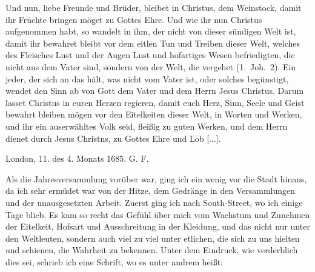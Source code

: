 {    Und nun, liebe Freunde und Brüder, bleibet in Christus,
    dem Weinstock, damit ihr Früchte bringen möget zu Gottes Ehre.
    Und wie ihr nun Christus aufgenommen habt, so wandelt in ihm,
    der nicht von dieser sündigen Welt ist, damit ihr bewahret bleibt
    vor dem eitlen Tun und Treiben dieser Welt, welches des Fleisches
    Lust und der Augen Lust und hofartiges Wesen befriedigten, die
    nicht aus dem Vater sind, sondern von der Welt, die vergehet
    (1.~Joh.~2). Ein jeder, der 
    sich an das hält, was nicht vom
    Vater ist, oder solches begünstigt, wendet den Sinn ab von Gott
    dem Vater und dem Herrn Jesus Christus. Darum lasset
    Christus in euren Herzen regieren, damit euch Herz, Sinn,
    Seele und Geist bewahrt bleiben mögen vor den Eitelkeiten dieser
    Welt, in Worten und Werken, und ihr ein auserwähltes Volk
    seid, fleißig zu guten Werken, und dem Herrn dienet durch Jesus
    Christns, zu Gottes Ehre und Lob [...].
    \bigskip
    \begin{flushright}
    London, 11. des 4. Monats 1685. G. F.\end{flushright}
}

Als die Jahresversammlung vorüber war, ging ich ein wenig
vor die Stadt hinaus, da ich sehr ermüdet war von der Hitze,
dem Gedränge in den Versammlungen und der unausgesetzten
Arbeit. Zuerst ging ich nach South-Street, wo ich einige Tage
blieb. Es kam so recht das Gefühl über mich vom Wachstum
und Zunehmen der Eitelkeit, 
Hofsart und Ausschreitung in der
Kleidung, und das nicht nur unter den Weltleuten, sondern
auch viel zu viel unter etlichen, die sich zu uns hielten und schienen,
die Wahrheit zu bekennen. Unter dem Eindruck, wie verderblich
dies sei, schrieb ich eine Schrift, wo es unter andrem heißt:

